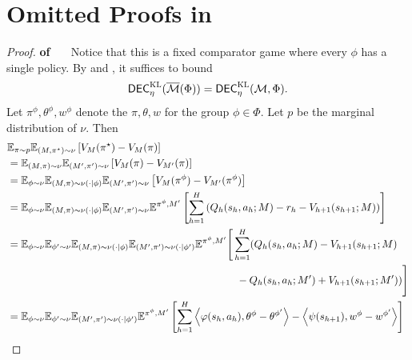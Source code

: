 \section{Omitted Proofs in }
\begin{proof}\textbf{of \ \ }
Notice that this is a fixed comparator game where every $\phi$ has a single policy. By  and , it suffices to bound 
\begin{align*}
    \dec^{\textsc{KL}}_{\eta}(\bar\calM(\Phi)) = \dec^{\textsc{KL}}_\eta(\calM,\Phi).  %
\end{align*}
    Let $\pi^\phi, \theta^\phi, w^\phi$ denote the $\pi, \theta, w$ for the group $\phi\in\Phi$.  Let $p$ be the marginal distribution of $\nu$. Then
    \begin{align}
        &\mathbb{E}_{\pi\sim p}  \E_{(M,\pi^\star)\sim \nu}\left[ V_M(\pi^\star) - V_M(\pi)\right]  \nonumber  \\
        &= \E_{(M,\pi)\sim \nu} \E_{(M',\pi')\sim \nu}\left[ V_M(\pi) - V_{M'}(\pi)\right] \nonumber \\
        &= \E_{\phi\sim \nu}\E_{(M,\pi)\sim \nu(\cdot|\phi)} \E_{(M', \pi')\sim \nu}\left[ V_M(\pi^\phi) - V_{M'}(\pi^\phi)\right] \nonumber \\
        &= \E_{\phi\sim \nu}\E_{(M,\pi)\sim \nu(\cdot|\phi)} \E_{(M', \pi')\sim \nu}\E^{\pi^\phi, M'}\left[ \sum_{h=1}^H \left(Q_h(s_h,a_h; M) - r_h - V_{h+1}(s_{h+1}; M)\right) \right] \nonumber \\
        &= \E_{\phi\sim \nu}\E_{\phi'\sim \nu}\E_{(M,\pi)\sim \nu(\cdot|\phi)} \E_{(M', \pi')\sim \nu(\cdot|\phi')}\E^{\pi^\phi,M'}\Bigg[ \sum_{h=1}^H (Q_h(s_h,a_h; M) - V_{h+1}(s_{h+1}; M) \nonumber \\
        &\qquad \qquad \qquad \qquad \qquad \qquad \qquad \qquad \qquad \qquad \qquad - Q_h(s_h,a_h; M') + V_{h+1}(s_{h+1}; M')) \Bigg] \nonumber \\
        &= \E_{\phi\sim \nu}\E_{\phi'\sim \nu}\E_{(M', \pi')\sim \nu(\cdot|\phi')}\E^{\pi^\phi,M'}\left[ \sum_{h=1}^H \inner{\varphi(s_h,a_h), \theta^\phi - \theta^{\phi'}} - \inner{\psi(s_{h+1}), w^\phi - w^{\phi'}}\right]\nonumber  \\

\end{align}
\end{proof}
